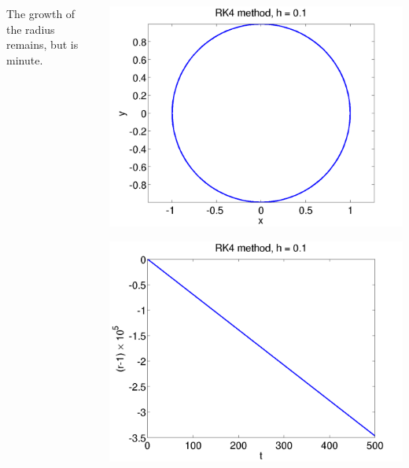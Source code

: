\documentclass{beamer}
\begin{document}
\begin{frame}
\begin{columns}
\begin{column}{0.5\textwidth}
\begin{overlayarea}{\textwidth}{0.4\textheight}
{          \vspace{1ex}
          The growth of the radius remains, but is minute.
        }
      \end{overlayarea}
    \end{column}
    \begin{column}{0.5\textwidth}
      \begin{overlayarea}{\textwidth}{0.6\textheight}
        {
          \begin{center}
            \includegraphics[height=0.5\textheight]{figures/RK4_1}
          \end{center}
        }
        {
          \begin{center}
            \includegraphics[height=0.5\textheight]{figures/RK4_rad1}

\end{center}}
\end{overlayarea}
\end{column}
\end{columns}
\end{frame}
\end{document}

